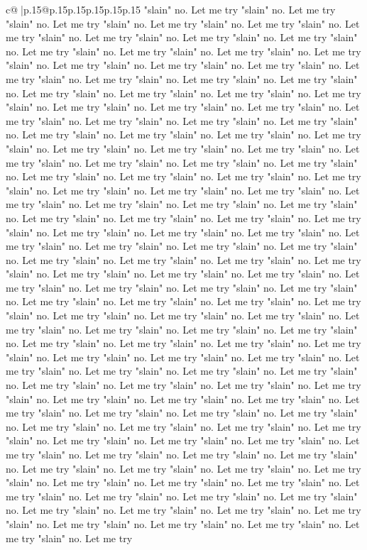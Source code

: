 \documentclass{article}
\begin{document}
{\begin{supertabular}{c@{$\;$}|p{.15\linewidth}@{}p{.15\linewidth}p{.15\linewidth}p{.15\linewidth}p{.15\linewidth}p{.15\linewidth}}
{{{"slain" no. Let me try "slain" no. Let me try "slain" no. Let me try "slain" no. Let me try "slain" no. Let me try "slain" no. Let me try "slain" no. Let me try "slain" no. Let me try "slain" no. Let me try "slain" no. Let me try "slain" no. Let me try "slain" no. Let me try "slain" no. Let me try "slain" no. Let me try "slain" no. Let me try "slain" no. Let me try "slain" no. Let me try "slain" no. Let me try "slain" no. Let me try "slain" no. Let me try "slain" no. Let me try "slain" no. Let me try "slain" no. Let me try "slain" no. Let me try "slain" no. Let me try "slain" no. Let me try "slain" no. Let me try "slain" no. Let me try "slain" no. Let me try "slain" no. Let me try "slain" no. Let me try "slain" no. Let me try "slain" no. Let me try "slain" no. Let me try "slain" no. Let me try "slain" no. Let me try "slain" no. Let me try "slain" no. Let me try "slain" no. Let me try "slain" no. Let me try "slain" no. Let me try "slain" no. Let me try "slain" no. Let me try "slain" no. Let me try "slain" no. Let me try "slain" no. Let me try "slain" no. Let me try "slain" no. Let me try "slain" no. Let me try "slain" no. Let me try "slain" no. Let me try "slain" no. Let me try "slain" no. Let me try "slain" no. Let me try "slain" no. Let me try "slain" no. Let me try "slain" no. Let me try "slain" no. Let me try "slain" no. Let me try "slain" no. Let me try "slain" no. Let me try "slain" no. Let me try "slain" no. Let me try "slain" no. Let me try "slain" no. Let me try "slain" no. Let me try "slain" no. Let me try "slain" no. Let me try "slain" no. Let me try "slain" no. Let me try "slain" no. Let me try "slain" no. Let me try "slain" no. Let me try "slain" no. Let me try "slain" no. Let me try "slain" no. Let me try "slain" no. Let me try "slain" no. Let me try "slain" no. Let me try "slain" no. Let me try "slain" no. Let me try "slain" no. Let me try "slain" no. Let me try "slain" no. Let me try "slain" no. Let me try "slain" no. Let me try "slain" no. Let me try "slain" no. Let me try "slain" no. Let me try "slain" no. Let me try "slain" no. Let me try "slain" no. Let me try "slain" no. Let me try "slain" no. Let me try "slain" no. Let me try "slain" no. Let me try "slain" no. Let me try "slain" no. Let me try "slain" no. Let me try "slain" no. Let me try "slain" no. Let me try "slain" no. Let me try "slain" no. Let me try "slain" no. Let me try "slain" no. Let me try "slain" no. Let me try "slain" no. Let me try "slain" no. Let me try "slain" no. Let me try "slain" no. Let me try "slain" no. Let me try "slain" no. Let me try "slain" no. Let me try "slain" no. Let me try "slain" no. Let me try "slain" no. Let me try "slain" no. Let me try "slain" no. Let me try "slain" no. Let me try "slain" no. Let me try "slain" no. Let me try "slain" no. Let me try "slain" no. Let me try "slain" no. Let me try "slain" no. Let me try "slain" no. Let me try "slain" no. Let me try "slain" no. Let me try "slain" no. Let me try "slain" no. Let me try "slain" no. Let me try "slain" no. Let me try "slain" no. Let me try "slain" no. Let me try "slain" no. Let me try "slain" no. Let me try "slain" no. Let me try "slain" no. Let me try "slain" no. Let me try }}}
\end{supertabular}}
\end{document}
